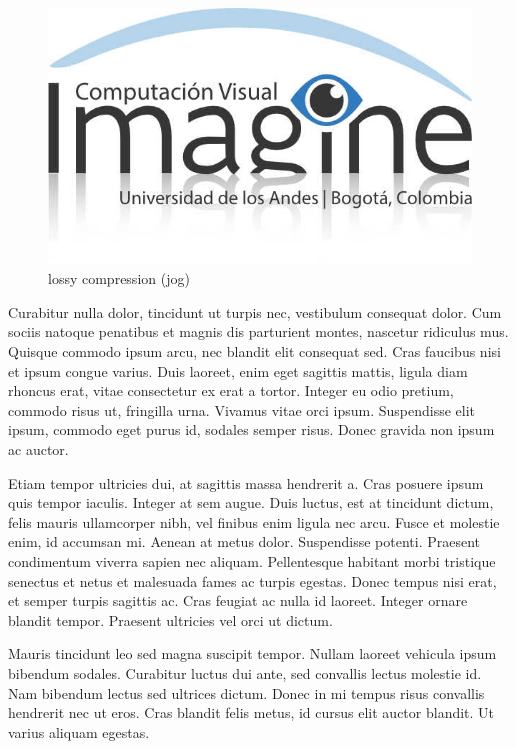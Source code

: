 \documentclass[10pt,twocolumn,letterpaper]{article}
\begin{document}
\begin{figure}[t]
\begin{center}
\includegraphics[width=0.8\linewidth]{imagine.jpg}
\end{center}
   \caption{lossy compression (jog)}
\label{fig:long}
\label{fig:onecol}
\end{figure}


Curabitur nulla dolor, tincidunt ut turpis nec, vestibulum consequat dolor. Cum sociis natoque penatibus et magnis dis parturient montes, nascetur ridiculus mus. Quisque commodo ipsum arcu, nec blandit elit consequat sed. Cras faucibus nisi et ipsum congue varius. Duis laoreet, enim eget sagittis mattis, ligula diam rhoncus erat, vitae consectetur ex erat a tortor. Integer eu odio pretium, commodo risus ut, fringilla urna. Vivamus vitae orci ipsum. Suspendisse elit ipsum, commodo eget purus id, sodales semper risus. Donec gravida non ipsum ac auctor.

Etiam tempor ultricies dui, at sagittis massa hendrerit a. Cras posuere ipsum quis tempor iaculis. Integer at sem augue. Duis luctus, est at tincidunt dictum, felis mauris ullamcorper nibh, vel finibus enim ligula nec arcu. Fusce et molestie enim, id accumsan mi. Aenean at metus dolor. Suspendisse potenti. Praesent condimentum viverra sapien nec aliquam. Pellentesque habitant morbi tristique senectus et netus et malesuada fames ac turpis egestas. Donec tempus nisi erat, et semper turpis sagittis ac. Cras feugiat ac nulla id laoreet. Integer ornare blandit tempor. Praesent ultricies vel orci ut dictum.

Mauris tincidunt leo sed magna suscipit tempor. Nullam laoreet vehicula ipsum bibendum sodales. Curabitur luctus dui ante, sed convallis lectus molestie id. Nam bibendum lectus sed ultrices dictum. Donec in mi tempus risus convallis hendrerit nec ut eros. Cras blandit felis metus, id cursus elit auctor blandit. Ut varius aliquam egestas.
\end{document}
